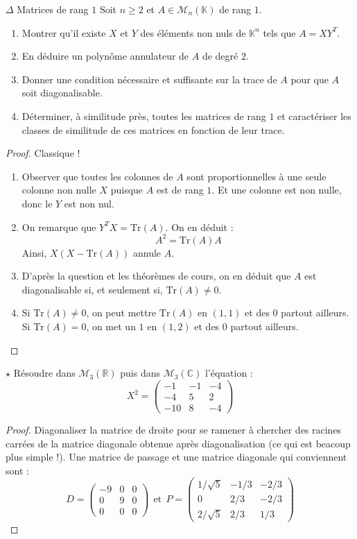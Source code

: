 \documentclass[french,a4paper]{article}
\newcommand{\R}{\mathbb{R}}
\newcommand{\C}{\mathbb{C}}
\newcommand{\K}{\mathbb{K}}
\newcommand{\Tr}{\text{Tr}}
\theoremstyle{plain}
\theoremstyle{definition}
\theoremstyle{remark}
\begin{document}
\begin{ex}{$\Delta$ Matrices de rang $1$}
	Soit $n\geqslant 2$ et $A\in\mathcal{M}_n(\K)$ de rang $1$.
	\begin{enumerate}
		\item Montrer qu'il existe $X$ et $Y$ des éléments non nuls de $\K^n$ tels que $A=XY^T$.
		\item En déduire un polynôme annulateur de $A$ de degré $2$.
		\item Donner une condition nécessaire et suffisante sur la trace de $A$ pour que $A$ soit diagonalisable.
		\item Déterminer, à similitude près, toutes les matrices de rang $1$ et caractériser les classes de similitude de ces matrices en fonction de leur trace.
	\end{enumerate}
\end{ex}
\begin{proof}
	Classique !
	\begin{enumerate}
		\item Observer que toutes les colonnes de $A$ sont proportionnelles à une seule colonne non nulle $X$ puisque $A$ est de rang $1$. Et une colonne est non nulle, donc le $Y$ est non nul.
		\item On remarque que $Y^TX=\Tr(A)$. On en déduit : $$A^2=\Tr(A)A$$ Ainsi, $X(X-\Tr(A))$ annule $A$.
		\item D'après la question et les théorèmes de cours, on en déduit que $A$ est diagonalisable si, et seulement si, $\Tr(A)\ne0$.
		\item Si $\Tr(A)\ne0$, on peut mettre $\Tr(A)$ en $(1,1)$ et des $0$ partout ailleurs. Si $\Tr(A)=0$, on met un $1$ en $(1,2)$ et des $0$ partout ailleurs.
	\end{enumerate}
\end{proof}

\begin{ex}{$\star$}
	Résoudre dans $\mathcal{M}_3(\R)$ puis dans $\mathcal{M}_3(\C)$ l'équation : $$X^2=\begin{pmatrix}
		-1&-1&-4\\
		-4&5&2\\
		-10&8&-4
	\end{pmatrix}$$
\end{ex}
\begin{proof}
	Diagonaliser la matrice de droite pour se ramener à chercher des racines carrées de la matrice diagonale obtenue après diagonalisation (ce qui est beacoup plus simple !). Une matrice de passage et une matrice diagonale qui conviennent sont : $$D=\begin{pmatrix}
		-9&0&0\\
		0&9&0\\
		0&0&0
	\end{pmatrix} \ \ \text{et}\ \ P=\begin{pmatrix}
	1/\sqrt{5}&-1/3&-2/3\\
	0&2/3&-2/3\\
	2/\sqrt{5}&2/3&1/3
	\end{pmatrix}$$
\end{proof}
\end{document}
